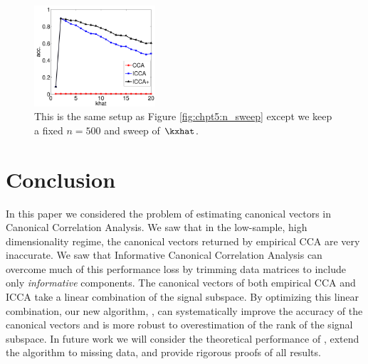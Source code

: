 \begin{figure}
  \centering
  \includegraphics[width=0.4\textwidth]{chpt5_icca_vect/figs/khat_sweep.pdf}  
  \caption{This is the same setup as Figure \ref{fig:chpt5:n_sweep} except we keep a fixed
    $n=500$ and sweep of $\kxhat$.}
  \label{fig:chpt5:k_sweep}
\end{figure}

\section{Conclusion}\label{sec:chpt5:conc}

In this paper we considered the problem of estimating canonical vectors in Canonical
Correlation Analysis. We saw that in the low-sample, high dimensionality regime, the
canonical vectors returned by empirical CCA are very inaccurate. We saw that Informative
Canonical Correlation Analysis can overcome much of this performance loss by trimming data
matrices to include only \textit{informative} components. The canonical vectors of both
empirical CCA and ICCA take a linear combination of the signal subspace. By optimizing
this linear combination, our new algorithm, \iccap, can systematically improve the
accuracy of the canonical vectors and is more robust to overestimation of the rank of the
signal subspace. In future work we will consider the theoretical performance of \iccap,
extend the algorithm to missing data, and provide rigorous proofs of all results.
